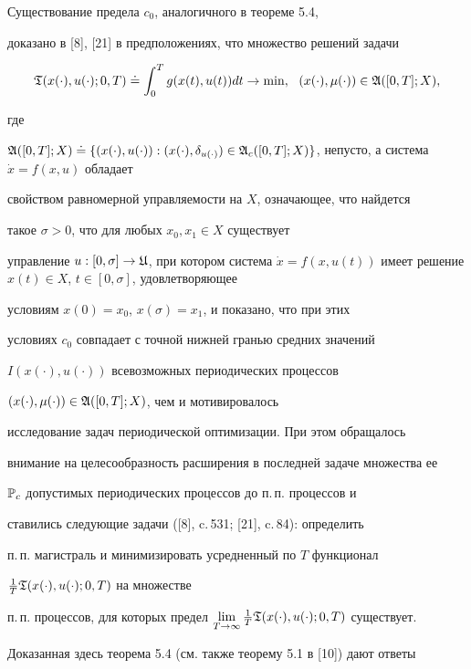 \begin{notes}


Существование предела $c_0$, аналогичного в теореме 5.4,


доказано в [8], [21] в предположениях, что множество решений задачи


$$


\frak T(x(\cdot),u(\cdot);0,T)\doteq\int_0^T g(x(t),u(t))dt\to\min,\ \


(x(\cdot),\mu(\cdot))\in\frak A([0, T];X),


$$


где


$\frak A([0,T];X)\doteq\{(x(\cdot),u(\cdot)):(x(\cdot),\delta_{u(\cdot)})


\in\frak A_c([0,T];X)\}$, непусто, а система $\Dot x=f(x,u)$ обладает


свойством равномерной управляемости на $X$, означающее, что найдется


такое $\sigma>0$, что для любых $x_0,x_1\in X$ существует


управление $u:[0,\sigma]\to\frak U$, при котором система $\Dot


x=f(x,u(t))$ имеет решение $x(t)\in X$, $t\in[0,\sigma]$, удовлетворяющее


условиям $x(0)=x_0$, $x(\sigma)=x_1$, и показано, что при этих


условиях $c_0$ совпадает с точной нижней гранью средних значений


$I(x(\cdot),u(\cdot))$ всевозможных периодических процессов


$(x(\cdot),\mu(\cdot))\in\frak A([0,T];X)$, чем и мотивировалось


исследование задач периодической оптимизации. При этом обращалось


внимание на целесообразность расширения в последней задаче множества ее


$\Bbb P_c$ допустимых периодических процессов до п.\,п. процессов и


ставились следующие задачи ([8], c.\,531; [21], c.\,84): определить


п.\,п. магистраль и минимизировать усредненный по $T$ функционал


$\frac{1}{T}\frak T(x(\cdot),u(\cdot);0,T)$ на множестве


п.\,п. процессов, для которых предел $\lim\limits_{T\to\infty}


\frac{1}{T}\frak T(x(\cdot),u(\cdot);0,T)$ существует.


Доказанная здесь теорема 5.4 (см. также теорему 5.1 в [10]) дают ответы



\end{notes}
